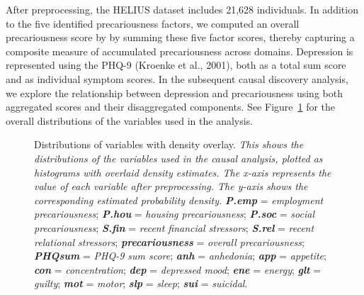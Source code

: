 \documentclass[
]{article}
\begin{document}
After preprocessing, the HELIUS dataset includes 21,628 individuals. In
addition to the five identified precariousness factors, we computed an
overall precariousness score by by summing these five factor scores,
thereby capturing a composite measure of accumulated precariousness
across domains. Depression is represented using the PHQ-9 (Kroenke et
al., 2001), both as a total sum score and as individual symptom scores.
In the subsequent causal discovery analysis, we explore the relationship
between depression and precariousness using both aggregated scores and
their disaggregated components. See Figure~\ref{fig-dist} for the
overall distributions of the variables used in the analysis.

\begin{figure}


\caption{\label{fig-dist}Distributions of variables with density
overlay. \emph{This shows the distributions of the variables used in the
causal analysis, plotted as histograms with overlaid density estimates.
The x-axis represents the value of each variable after preprocessing.
The y-axis shows the corresponding estimated probability density.}
\textbf{\emph{P.emp}} = \emph{employment precariousness};
\textbf{\emph{P.hou}} = \emph{housing precariousness};
\textbf{\emph{P.soc}} = \emph{social precariousness};
\textbf{\emph{S.fin}} = \emph{recent financial stressors};
\textbf{\emph{S.rel}} = \emph{recent relational stressors};
\textbf{\emph{precariousness}} = \emph{overall precariousness};
\textbf{\emph{PHQsum}} = \emph{PHQ-9 sum score}; \textbf{\emph{anh}} =
\emph{anhedonia}; \textbf{\emph{app}} = \emph{appetite};
\textbf{\emph{con}} = \emph{concentration}; \textbf{\emph{dep}} =
\emph{depressed mood}; \textbf{\emph{ene}} = \emph{energy};
\textbf{\emph{glt}} = \emph{guilty}; \textbf{\emph{mot}} = \emph{motor};
\textbf{\emph{slp}} = \emph{sleep}; \textbf{\emph{sui}} =
\emph{suicidal}.}

\end{figure}%
\end{document}

